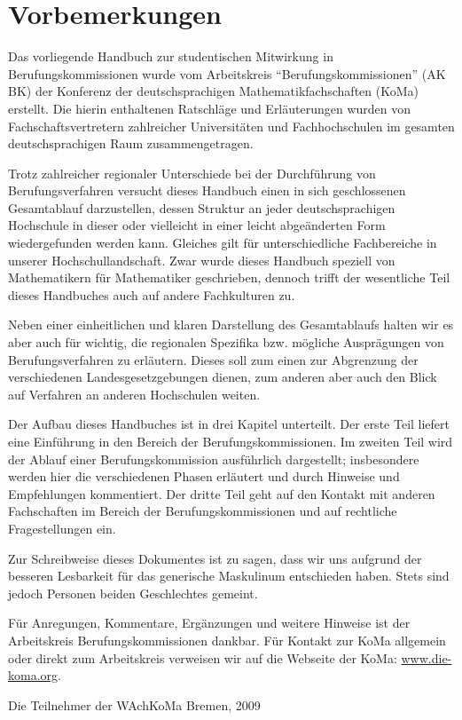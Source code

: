 \chapter*{Vorbemerkungen}\thispagestyle{fancy}

Das vorliegende Handbuch zur studentischen Mitwirkung in Berufungskommissionen wurde vom Arbeitskreis "`Berufungskommissionen"' (AK BK) der Konferenz der deutschsprachigen Mathematikfachschaften (KoMa) erstellt. Die hierin enthaltenen Ratschläge und Erläuterungen wurden von Fachschaftsvertretern zahlreicher Universitäten und Fachhochschulen im gesamten deutschsprachigen Raum zusammengetragen.

Trotz zahlreicher regionaler Unterschiede bei der Durchführung von Berufungsverfahren versucht dieses Handbuch einen in sich geschlossenen Gesamtablauf darzustellen, dessen Struktur an jeder deutschsprachigen Hochschule in dieser oder vielleicht in einer leicht abgeänderten Form wiedergefunden werden kann. Gleiches gilt für unterschiedliche Fachbereiche in unserer Hochschullandschaft. Zwar wurde dieses Handbuch speziell von Mathematikern für Mathematiker geschrieben, dennoch trifft der wesentliche Teil dieses Handbuches auch auf andere Fachkulturen zu.

Neben einer einheitlichen und klaren Darstellung des Gesamtablaufs halten wir es aber auch für wichtig, die regionalen Spezifika bzw. mögliche Ausprägungen von Berufungsverfahren zu erläutern. Dieses soll zum einen zur Abgrenzung der verschiedenen Landesgesetzgebungen dienen, zum anderen aber auch den Blick auf Verfahren an anderen Hochschulen weiten.

Der Aufbau dieses Handbuches ist in drei Kapitel unterteilt. Der erste Teil liefert eine Einführung in den Bereich der Berufungskommissionen. Im zweiten Teil wird der Ablauf einer Berufungskommission ausführlich dargestellt; insbesondere werden hier die verschiedenen Phasen erläutert und durch Hinweise und Empfehlungen kommentiert. Der dritte Teil geht auf den Kontakt mit anderen Fachschaften im Bereich der Berufungskommissionen und auf rechtliche Fragestellungen ein.

Zur Schreibweise dieses Dokumentes ist zu sagen, dass wir uns aufgrund der besseren Lesbarkeit für das generische Maskulinum entschieden haben. Stets sind jedoch Personen beiden Geschlechtes gemeint.

Für Anregungen, Kommentare, Ergänzungen und weitere Hinweise ist der Arbeitskreis Berufungskommissionen dankbar. Für Kontakt zur KoMa allgemein oder direkt zum Arbeitskreis verweisen wir auf die Webseite der KoMa: \url{www.die-koma.org}.

\vspace{1cm}\noindent
Die Teilnehmer der WAchKoMa Bremen, 2009

